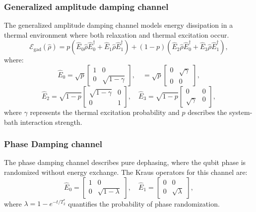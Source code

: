 \subsubsection{Generalized amplitude damping channel}
The generalized amplitude damping channel models energy dissipation in a thermal environment where both relaxation and thermal excitation occur. 
\begin{equation}\label{eq:GAD_channel}
    \mathcal{E}_{\text{gad}}(\hat{\rho}) = p \left( \hat{E}_0 \hat{\rho} \hat{E}_0^{\dagger} + \hat{E}_1 \hat{\rho} \hat{E}_1^{\dagger} \right) + (1 - p) \left( \hat{E}_2 \hat{\rho} \hat{E}_0^{\dagger} + \hat{E}_3 \hat{\rho} \hat{E}_1^{\dagger} \right),
\end{equation}
where:
\begin{equation}
    \hat{E}_0 = \sqrt{p} \begin{bmatrix} 1 & 0 \\ 0 & \sqrt{1 - \gamma} \end{bmatrix}, \quad
     = \sqrt{p} \begin{bmatrix} 0 & \sqrt{\gamma} \\ 0 & 0 \end{bmatrix},
\end{equation}
\begin{equation}
    \hat{E}_2 = \sqrt{1 - p} \begin{bmatrix} \sqrt{1 - \gamma} & 0 \\ 0 & 1 \end{bmatrix}, \quad
    \hat{E}_3 = \sqrt{1 - p} \begin{bmatrix} 0 & 0 \\ \sqrt{\gamma} & 0 \end{bmatrix},
\end{equation}
where $\gamma$ represents the thermal excitation probability and $p$ describes the system-bath interaction strength.

\subsubsection{Phase Damping channel}
The phase damping channel describes pure dephasing, where the qubit phase is randomized without energy exchange. The Kraus operators for this channel are:
\begin{equation}
    \hat{E}_0 = \begin{bmatrix} 1 & 0 \\ 0 & \sqrt{1 - \lambda} \end{bmatrix}, \quad
    \hat{E}_1 = \begin{bmatrix} 0 & 0 \\ 0 & \sqrt{\lambda} \end{bmatrix},
\end{equation}
where $\lambda = 1 - e^{-t/T_2^*}$ quantifies the probability of phase randomization.


